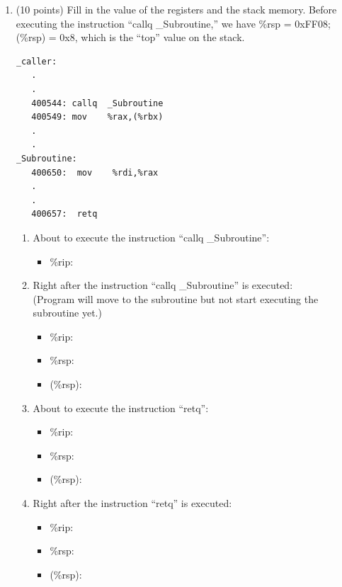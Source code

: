 \documentclass[11pt]{article}
\newcommand{\fillin}[1]{\underline{\makebox[1.6in][l]{\,#1}}}
\begin{document}
\begin{enumerate}[leftmargin=*]
\item (10 points) Fill in the value of the registers and the stack memory. Before executing
the instruction ``callq \_Subroutine,'' we have \%rsp = 0xFF08; (\%rsp) = 0x8, which is
the ``top'' value on the stack.

\begin{Verbatim}[xleftmargin=1.5em]
_caller:
   .
   .
   400544: callq  _Subroutine
   400549: mov    %rax,(%rbx)
   .
   .
_Subroutine:
   400650:  mov    %rdi,%rax
   .
   .
   400657:  retq
\end{Verbatim}

\begin{enumerate}[label=\arabic*)]

  \item About to execute the instruction ``callq \_Subroutine'':
  \begin{itemize}[label={},leftmargin=2em]
    \item \%rip: \fillin{}
  \end{itemize}

  \item Right after the instruction ``callq \_Subroutine'' is executed:\\
  (Program will move to the subroutine but not start executing the subroutine yet.)
  \begin{itemize}[label={},leftmargin=2em]
    \item \%rip: \fillin{}
    \item \%rsp: \fillin{}
    \item (\%rsp): \fillin{}
  \end{itemize}

  \item About to execute the instruction ``retq'':
  \begin{itemize}[label={},leftmargin=2em]
    \item \%rip: \fillin{}
    \item \%rsp: \fillin{}
    \item (\%rsp): \fillin{}
  \end{itemize}

  \item Right after the instruction ``retq'' is executed:
  \begin{itemize}[label={},leftmargin=2em]
    \item \%rip: \fillin{}
    \item \%rsp: \fillin{}
    \item (\%rsp): \fillin{}
  \end{itemize}

\end{enumerate}

\end{enumerate}
\end{document}

